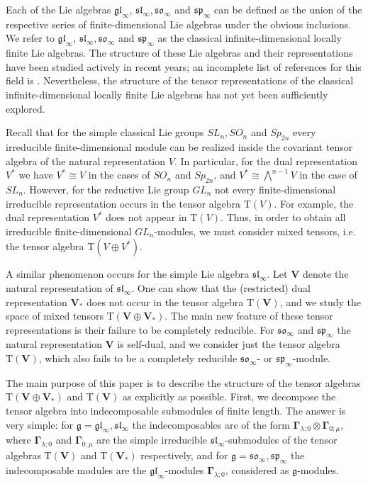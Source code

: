 \documentclass[12pt,reqno]{amsart}
\numberwithin{equation}{section}
\theoremstyle{plain}
\theoremstyle{definition}
\def\gl{\mathfrak{gl}}
\def\sl{\mathfrak{sl}}
\def\so{\mathfrak{so}}
\def\sp{\mathfrak{sp}}
\def\o{\otimes}
\def\g{\mathfrak g}
\def\glV_#1{\boldsymbol\Gamma_{#1}}
\def\VV{\mathbf V}
\def\TT{\mathrm T}
\begin{document}
Each of the Lie algebras $\gl_\infty$, $\sl_\infty, \so_\infty$ and
$\sp_\infty$ can be defined as the union of the respective series of
finite-dimensional Lie algebras under the obvious inclusions. We refer to
$\gl_\infty$, $\sl_\infty, \so_\infty$ and $\sp_\infty$ as the classical infinite-dimensional locally finite Lie algebras.
The structure of these Lie algebras and their representations have been studied actively in recent years; an incomplete list of references for this field is
\cite{Ba,BB,BS,DP1,DP2,DPS,DPW,N,NS,Na,NP,O,PS,PZ}. Nevertheless,
the structure of the tensor representations of the classical infinite-dimensional locally finite Lie algebras has not yet been sufficiently explored.

Recall that for the simple classical Lie groups $SL_n, SO_n$ and
$Sp_{2n}$ every irreducible finite-dimensional module can be
realized inside the covariant tensor algebra of the natural
representation $V$. In particular, for the dual representation $V^*$
we have $V^* \cong V$ in the cases of $SO_n$ and $Sp_{2n}$, and $V^*
\cong \bigwedge^{n-1}V$ in the case of $SL_n$. However, for the
reductive Lie group $GL_n$ not every finite-dimensional
irreducible representation occurs in the tensor algebra $\TT(V)$.
For example, the dual representation $V^*$ does not appear in $\TT(V)$.
Thus, in order to obtain all irreducible finite-dimensional
$GL_n$-modules, we must consider mixed tensors, i.e. the tensor
algebra $\TT(V \oplus V^*)$.

A similar phenomenon occurs for the simple Lie algebra $\sl_\infty$.
Let $\VV$ denote the natural representation of $\sl_\infty$. One can
show that the (restricted) dual representation $\VV_*$ does not
occur in the tensor algebra $\TT(\VV)$, and we study the space of
mixed tensors $\TT(\VV \oplus \VV_*)$. The main new feature of these
tensor representations is their failure to be completely reducible.
For $\so_\infty$ and $\sp_\infty$ the natural representation $\VV$
is self-dual, and we consider just the tensor algebra $\TT(\VV)$,
which also fails to be a completely reducible $\so_\infty$- or
$\sp_\infty$-module.

The main purpose of this paper is to describe the structure of the
tensor algebras $\TT(\VV\oplus \VV_*)$ and $\TT(\VV)$
as explicitly as possible. First, we decompose the tensor algebra
into indecomposable submodules of finite length. The answer is very
simple: for $\g = \gl_\infty, \sl_\infty$ the indecomposables are of
the form $\glV_{\lambda;0} \o \glV_{0;\mu}$, where
$\glV_{\lambda;0}$ and $\glV_{0;\mu}$ are the simple irreducible
$\sl_\infty$-submodules of the tensor algebras $\TT(\VV)$ and
$\TT(\VV_*)$ respectively, and for $\g = \so_\infty, \sp_\infty$ the
indecomposable modules are the $\gl_\infty$-modules
$\glV_{\lambda;0}$, considered as $\g$-modules.
\end{document}
